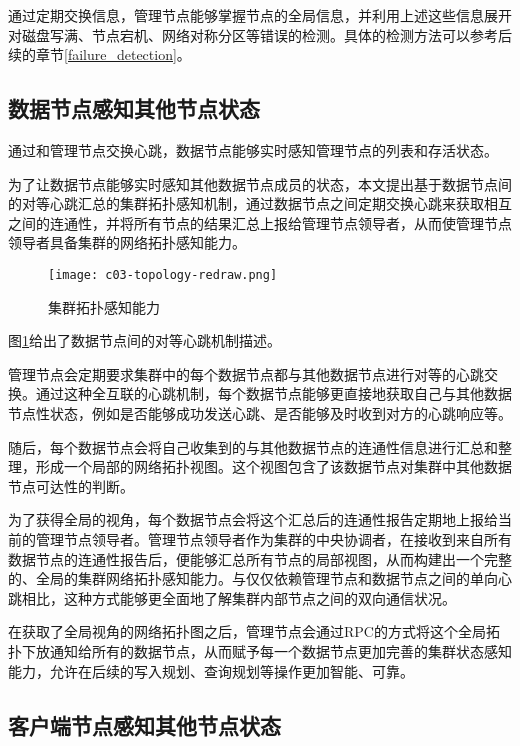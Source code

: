 通过定期交换信息，管理节点能够掌握节点的全局信息，并利用上述这些信息展开对磁盘写满、节点宕机、网络对称分区等错误的检测。具体的检测方法可以参考后续的章节\ref{failure_detection}。

\subsection{数据节点感知其他节点状态}\label{sec:数据节点-intra-heartbeat}

通过和管理节点交换心跳，数据节点能够实时感知管理节点的列表和存活状态。

为了让数据节点能够实时感知其他数据节点成员的状态，本文提出基于数据节点间的对等心跳汇总的集群拓扑感知机制，通过数据节点之间定期交换心跳来获取相互之间的连通性，并将所有节点的结果汇总上报给管理节点领导者，从而使管理节点领导者具备集群的网络拓扑感知能力。

\begin{figure}
  \centering
  \texttt{[image: c03-topology-redraw.png]}
  \caption{集群拓扑感知能力}
  \label{fig:c03-topology}
\end{figure}

图\ref{fig:c03-topology}给出了数据节点间的对等心跳机制描述。

管理节点会定期要求集群中的每个数据节点都与其他数据节点进行对等的心跳交换。通过这种全互联的心跳机制，每个数据节点能够更直接地获取自己与其他数据节点性状态，例如是否能够成功发送心跳、是否能够及时收到对方的心跳响应等。

随后，每个数据节点会将自己收集到的与其他数据节点的连通性信息进行汇总和整理，形成一个局部的网络拓扑视图。这个视图包含了该数据节点对集群中其他数据节点可达性的判断。

为了获得全局的视角，每个数据节点会将这个汇总后的连通性报告定期地上报给当前的管理节点领导者。管理节点领导者作为集群的中央协调者，在接收到来自所有数据节点的连通性报告后，便能够汇总所有节点的局部视图，从而构建出一个完整的、全局的集群网络拓扑感知能力。与仅仅依赖管理节点和数据节点之间的单向心跳相比，这种方式能够更全面地了解集群内部节点之间的双向通信状况。

在获取了全局视角的网络拓扑图之后，管理节点会通过RPC的方式将这个全局拓扑下放通知给所有的数据节点，从而赋予每一个数据节点更加完善的集群状态感知能力，允许在后续的写入规划、查询规划等操作更加智能、可靠。

\subsection{客户端节点感知其他节点状态}

